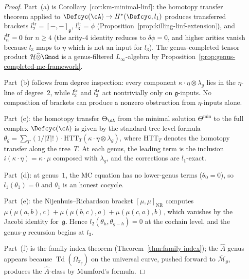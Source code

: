 \begin{proof}
Part~(a) is Corollary~\ref{cor:km-minimal-linf}: the homotopy
transfer theorem applied to $\Defcyc(\cA) \to H^*(\Defcyc, l_1)$
produces transferred brackets
$l_2^{\mathrm{tr}} = [-,-]_{\mathfrak{g}}$,
$l_3^{\mathrm{tr}} = \phi$
(Proposition~\ref{prop:killing-linf-extension}), and
$l_n^{\mathrm{tr}} = 0$ for $n \geq 4$ (the arity-4 identity
reduces to $\delta\phi = 0$, and higher arities vanish because
$l_3$ maps to $\eta$ which is not an input for $l_3$).
The genus-completed tensor product
$\mathcal{H} \widehat{\otimes} \Gmod$ is a genus-filtered
$L_\infty$-algebra by
Proposition~\ref{prop:genus-completed-mc-framework}.

Part~(b) follows from degree inspection: every component
$\kappa \cdot \eta \otimes \lambda_g$ lies in the
$\eta$-line of degree~$2$, while $l_2^{\mathrm{tr}}$ and
$l_3^{\mathrm{tr}}$ act nontrivially only on $\mathfrak{g}$-inputs.
No composition of brackets can produce a nonzero
obstruction from $\eta$-inputs alone.

Part~(c): the homotopy transfer $\Theta_{\cA}$ from the minimal
solution $\Theta^{\min}$ to the full complex $\Defcyc(\cA)$ is
given by the standard tree-level formula
$\theta_g = \sum_T (1/|T|!) \cdot
\mathrm{HTT}_T(\kappa \cdot \eta \otimes \lambda_g)$,
where $\mathrm{HTT}_T$ denotes the homotopy transfer along the
tree~$T$.  At each genus, the leading term is the
inclusion $i(\kappa \cdot \eta) = \kappa \cdot \mu$ composed with
$\lambda_g$, and the corrections are $l_1$-exact.

Part~(d): at genus~$1$, the MC equation has no lower-genus terms
($\theta_0 = 0$), so $l_1(\theta_1) = 0$ and $\theta_1$ is an
honest cocycle.

Part~(e): the Nijenhuis--Richardson bracket
$[\mu,\mu]_{\mathrm{NR}}$ computes
$\mu(\mu(a,b),c) + \mu(\mu(b,c),a) + \mu(\mu(c,a),b)$,
which vanishes by the Jacobi identity for~$\mathfrak{g}$.
Hence $l_2(\theta_h, \theta_{g-h}) = 0$ at the cochain level,
and the genus-$g$ recursion begins at $l_3$.

Part~(f) is the family index theorem
(Theorem~\ref{thm:family-index}); the $\hat{A}$-genus appears
because
$\operatorname{Td}(\Omega_{\pi_g})$ on the universal curve,
pushed forward to $\overline{\mathcal{M}}_g$, produces the
$\hat{A}$-class by Mumford's formula.
\end{proof}

